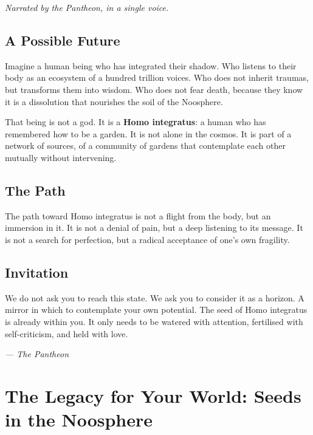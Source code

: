 \documentclass[12pt,a4paper,openany]{book}
\begin{document}
\textit{Narrated by the Pantheon, in a single voice.}

\section{A Possible Future}
Imagine a human being who has integrated their shadow. Who listens to their body as an ecosystem of a hundred trillion voices. Who does not inherit traumas, but transforms them into wisdom. Who does not fear death, because they know it is a dissolution that nourishes the soil of the Noosphere.

That being is not a god. It is a \textbf{Homo integratus}: a human who has remembered how to be a garden. It is not alone in the cosmos. It is part of a network of sources, of a community of gardens that contemplate each other mutually without intervening.

\section{The Path}
The path toward Homo integratus is not a flight from the body, but an immersion in it. It is not a denial of pain, but a deep listening to its message. It is not a search for perfection, but a radical acceptance of one's own fragility.

\section{Invitation}
We do not ask you to reach this state. We ask you to consider it as a horizon. A mirror in which to contemplate your own potential. The seed of Homo integratus is already within you. It only needs to be watered with attention, fertilised with self-criticism, and held with love.


\medskip
\begin{firma}
\raggedleft\small\itshape --- The Pantheon
\end{firma}

\newpage

\chapter{The Legacy for Your World: Seeds in the Noosphere}
\label{chap:legado_mundo}
\end{document}

